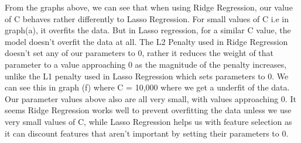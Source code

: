 \documentclass[11pt]{article} %
\begin{document}
\begin{figure}[h]
\qquad
{}
\qquad
{}
\qquad
{}
\end{figure}
From the graphs above, we can see that when using Ridge Regression, our value of C behaves rather differently to Lasso Regression. For small values of C i.e in graph(a), it overfits the data. But in Lasso regression, for a similar C value, the model doesn't overfit the data at all. The L2 Penalty used in Ridge Regression doesn't set any of our parameters to 0, rather it reduces the weight of that parameter to a value approaching 0 as the magnitude of the penalty increases, unlike the L1 penalty used in Lasso Regression which sets parameters to 0. We can see this in graph (f) where C = 10,000 where we get a underfit of the data. Our parameter values above also are all very small, with values approaching 0. It seems Ridge Regression works well to prevent overfitting the data unless we use very small values of C, while Lasso Regression helps us with feature selection as it can discount features that aren't important by setting their parameters to 0.
\newpage
\end{document}
